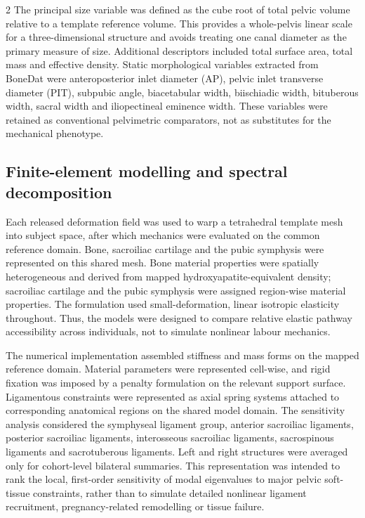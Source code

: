 \documentclass[openacc]{rsproca_new}
\begin{document}
\begin{multicols}{2}
The principal size variable was defined as the cube root of total pelvic volume relative to a template reference volume. This provides a whole-pelvis linear scale for a three-dimensional structure and avoids treating one canal diameter as the primary measure of size. Additional descriptors included total surface area, total mass
and effective density. Static morphological variables extracted from BoneDat were anteroposterior inlet diameter (AP), pelvic inlet transverse diameter (PIT), subpubic angle, biacetabular width, biischiadic width, bituberous width, sacral width and iliopectineal eminence width. These variables were retained as conventional pelvimetric comparators, not as substitutes for the mechanical phenotype.

\subsection{Finite-element modelling and spectral decomposition}

Each released deformation field was used to warp a tetrahedral template mesh into subject space, after which mechanics were evaluated on the common reference domain. Bone, sacroiliac cartilage and the pubic symphysis were represented on this shared mesh. Bone material properties were spatially heterogeneous and derived from mapped hydroxyapatite-equivalent density; sacroiliac cartilage and the pubic symphysis were assigned region-wise material properties. The formulation used small-deformation, linear isotropic elasticity throughout. Thus, the models were designed to compare relative elastic pathway accessibility across individuals, not to simulate nonlinear labour mechanics.

The numerical implementation assembled stiffness and mass forms on the mapped reference domain. Material parameters were represented cell-wise, and rigid fixation was imposed by a penalty formulation on the relevant support surface. Ligamentous constraints were represented as axial spring systems attached to corresponding anatomical regions on the shared model domain. The sensitivity analysis considered the symphyseal ligament group, anterior sacroiliac ligaments, posterior sacroiliac ligaments, interosseous sacroiliac ligaments, sacrospinous ligaments and sacrotuberous ligaments. Left and right structures were averaged only for cohort-level bilateral summaries. This representation was intended to rank the local, first-order sensitivity of modal eigenvalues to major pelvic soft-tissue constraints, rather than to simulate detailed nonlinear ligament recruitment, pregnancy-related remodelling or tissue failure.


\end{multicols}
\end{document}
